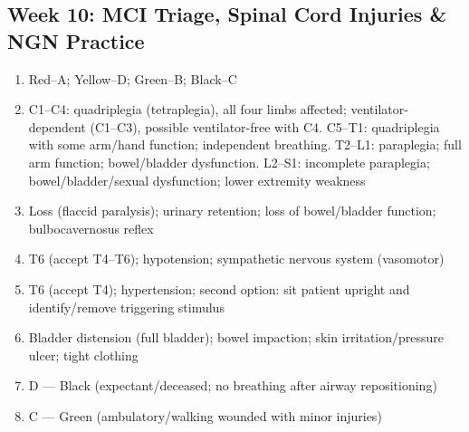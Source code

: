 \documentclass[11pt,letterpaper]{article}
\begin{document}
\begin{keybox}
\subsection*{Week 10: MCI Triage, Spinal Cord Injuries \& NGN Practice}
\begin{enumerate}[leftmargin=1.5em,label=\textbf{\arabic*.},start=101]
  \item Red--A; Yellow--D; Green--B; Black--C
  \item C1--C4: quadriplegia (tetraplegia), all four limbs affected; ventilator-dependent (C1--C3), possible ventilator-free with C4.
        C5--T1: quadriplegia with some arm/hand function; independent breathing.
        T2--L1: paraplegia; full arm function; bowel/bladder dysfunction.
        L2--S1: incomplete paraplegia; bowel/bladder/sexual dysfunction; lower extremity weakness
  \item Loss (flaccid paralysis); urinary retention; loss of bowel/bladder function; bulbocavernosus reflex
  \item T6 (accept T4--T6); hypotension; sympathetic nervous system (vasomotor)
  \item T6 (accept T4); hypertension; second option: sit patient upright and identify/remove triggering stimulus
  \item Bladder distension (full bladder); bowel impaction; skin irritation/pressure ulcer; tight clothing
  \item D --- Black (expectant/deceased; no breathing after airway repositioning)
  \item C --- Green (ambulatory/walking wounded with minor injuries)
\end{enumerate}

\hrulefill

\end{keybox}
\end{document}
